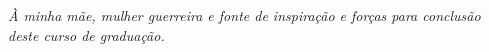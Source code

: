 \documentclass[
	12pt,			%
	openright,		%
	oneside,	
	a4paper,		%
	english,		%
	brazil			%
]{abntex2/abntex2}  %
\begin{document}
	\noindent


	\frenchspacing

	\imprimircapa

	\imprimirfolhaderosto
	
	\begin{fichacatalografica}
		
	\end{fichacatalografica}

	\begin{folhadeaprovacao}
		
	\end{folhadeaprovacao}

	\begin{dedicatoria}
		
		\vspace*{\fill}
		\noindent
		\leftskip=7cm
		\textit{À minha mãe, mulher guerreira e fonte de inspiração e forças para conclusão deste curso de graduação.}
		\vspace{5cm}
	
	\end{dedicatoria}
\end{document}
